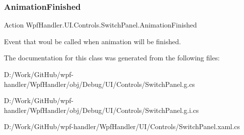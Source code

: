 \subsubsection{\texorpdfstring{Animation\+Finished}{AnimationFinished}}
{\footnotesize\ttfamily Action Wpf\+Handler.\+U\+I.\+Controls.\+Switch\+Panel.\+Animation\+Finished}



Event that woul be called when animation will be finished. 



The documentation for this class was generated from the following files\+:\begin{DoxyCompactItemize}
\item 
D\+:/\+Work/\+Git\+Hub/wpf-\/handler/\+Wpf\+Handler/obj/\+Debug/\+U\+I/\+Controls/Switch\+Panel.\+g.\+cs\item 
D\+:/\+Work/\+Git\+Hub/wpf-\/handler/\+Wpf\+Handler/obj/\+Debug/\+U\+I/\+Controls/Switch\+Panel.\+g.\+i.\+cs\item 
D\+:/\+Work/\+Git\+Hub/wpf-\/handler/\+Wpf\+Handler/\+U\+I/\+Controls/Switch\+Panel.\+xaml.\+cs\end{DoxyCompactItemize}
